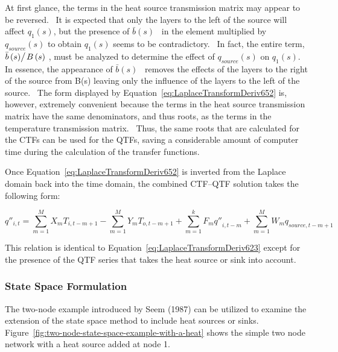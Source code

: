 At first glance, the terms in the heat source transmission matrix may appear to be reversed.~ It is expected that only the layers to the left of the source will affect \(q_1(s)\), but the presence of \(\bar b\left( s \right)\) ~in the element multiplied by \(q_{source}(s)\) to obtain \(q_1(s)\) seems to be contradictory.~ In fact, the entire term, \({{\bar b\left( s \right)} \mathord{\left/ {\vphantom {{\bar b\left( s \right)} {B\left( s \right)}}} \right. } {B\left( s \right)}}\) , must be analyzed to determine the effect of \(q_{source}(s)\) on \(q_1(s)\).~ In essence, the appearance of \(\bar b\left( s \right)\) ~removes the effects of the layers to the right of the source from B(s) leaving only the influence of the layers to the left of the source.~ The form displayed by Equation~\ref{eq:LaplaceTransformDeriv652} is, however, extremely convenient because the terms in the heat source transmission matrix have the same denominators, and thus roots, as the terms in the temperature transmission matrix.~ Thus, the same roots that are calculated for the CTFs can be used for the QTFs, saving a considerable amount of computer time during the calculation of the transfer functions.

Once Equation~\ref{eq:LaplaceTransformDeriv652} is inverted from the Laplace domain back into the time domain, the combined CTF--QTF solution takes the following form:

\begin{equation}
{q''_{i,t}} = \sum\limits_{m = 1}^M {{X_m}{T_{i,t - m + 1}}}  - \sum\limits_{m = 1}^M {{Y_m}{T_{o,t - m + 1}}}  + \sum\limits_{m = 1}^k {{F_m}{{q''}_{i,t - m}}}  + \sum\limits_{m = 1}^M {{W_m}{q_{source,t - m + 1}}}
\label{eq:LaplaceTransformDeriv653}
\end{equation}

This relation is identical to Equation~\ref{eq:LaplaceTransformDeriv623} except for the presence of the QTF series that takes the heat source or sink into account.

\subsubsection{State Space Formulation}\label{state-space-formulation-1}

The two-node example introduced by Seem (1987) can be utilized to examine the extension of the state space method to include heat sources or sinks.~ Figure~\ref{fig:two-node-state-space-example-with-a-heat} shows the simple two node network with a heat source added at node 1.

